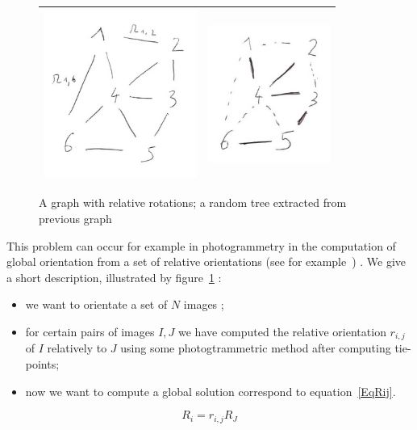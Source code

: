 \documentclass[a4paper]{article}
\begin{document}
\begin{figure}
\centering
\begin{tabular}{||c|c||}
 \hline \hline
\includegraphics[width=5cm]{FIGS/FTD-GraphRot.jpg} &
\includegraphics[width=4cm]{FIGS/FTD-TreeRot.jpg}
 \\ \hline \hline
\end{tabular}
\caption{A graph with relative rotations; a random tree extracted from previous graph}
\label{TreeRot}
\end{figure}

This problem can occur for example in photogrammetry in the computation
of global orientation from a set of relative orientations (see for example~\cite{Govin2006}) . 
We give a short description, illustrated by figure~\ref{TreeRot} :

\begin{itemize}
   \item  we want to orientate a set of $N$ images ;
   \item  for certain  pairs of images $I,J$ we have computed the relative orientation $r_{i,j}$
         of $I$ relatively to $J$ using some photogtrammetric method after computing tie-points;
    \item now we want to compute a global solution correspond  to equation~\ref{EqRij}.
\end{itemize}

\begin{equation}
   R_i = r_{i,j} R_J \label{EqRij}
\end{equation}
\end{document}
